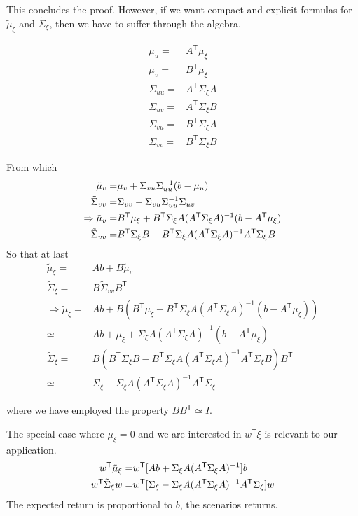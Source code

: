 \documentclass[letter, 12pt]{article}
\newcommand{\transpose}{^\mathsf{T}}
\newcommand{\inv}{^{-1}}
\begin{document}
This concludes the proof. However, if we want compact and explicit formulas for $\tilde \mu_\xi$ and $\tilde \Sigma_{\xi}$, then we have to suffer through the algebra.

\begin{align*}
\mu_u = & A\transpose \mu_\xi\\
\mu_v = & B\transpose\mu_\xi\\
\Sigma_{uu} = & A\transpose \Sigma_\xi A \\
\Sigma_{uv} = & A\transpose \Sigma_\xi B\\
\Sigma_{vu} = & B\transpose \Sigma_\xi A\\
\Sigma_{vv} = & B\transpose \Sigma_\xi B
\end{align*}

From which
\begin{align*}
\tilde\mu_v=&\mu_v + \Sigma_{vu} \Sigma_{uu}\inv(b-\mu_u) \notag \\
\tilde\Sigma_{vv}=& \Sigma_{vv} - \Sigma_{vu} \Sigma_{uu}\inv \Sigma_{uv} \\
\Rightarrow
\tilde\mu_v=& B\transpose\mu_\xi + B\transpose \Sigma_\xi A (A\transpose \Sigma_\xi A )\inv(b-A\transpose \mu_\xi) \\
\tilde\Sigma_{vv}=& B\transpose \Sigma_\xi B - B\transpose \Sigma_\xi A ( A\transpose \Sigma_\xi A) \inv A\transpose \Sigma_\xi B
\end{align*}
So that at last
\begin{align*}
\tilde \mu_\xi=& Ab + B \tilde\mu_v \\
\tilde \Sigma_{\xi}= & B\tilde\Sigma_{vv} B\transpose \\
\Rightarrow
\tilde\mu_\xi = & Ab + B(B\transpose\mu_\xi + B\transpose \Sigma_\xi A (A\transpose \Sigma_\xi A )\inv(b-A\transpose \mu_\xi))\\
\simeq & Ab + \mu_\xi + \Sigma_\xi A (A\transpose \Sigma_\xi A )\inv(b-A\transpose \mu_\xi) \\
\tilde \Sigma_{\xi} = & B (B\transpose \Sigma_\xi B - B\transpose \Sigma_\xi A ( A\transpose \Sigma_\xi A) \inv A\transpose \Sigma_\xi B) B\transpose\\
\simeq & \Sigma_\xi - \Sigma_\xi A ( A\transpose \Sigma_\xi A) \inv A\transpose \Sigma_\xi
\end{align*}

where we have employed the property $B B\transpose \simeq I$.

The special case where $\mu_\xi=0$ and we are interested in $w\transpose \xi$ is relevant to our application.
\begin{align}
w\transpose \tilde\mu_\xi = & w\transpose [A b + \Sigma_\xi A (A\transpose \Sigma_\xi A)\inv] b\label{eq:cond2}\\
w\transpose \tilde \Sigma_{\xi} w = & w\transpose [ \Sigma_\xi - \Sigma_\xi A ( A\transpose \Sigma_\xi A) \inv A\transpose \Sigma_\xi ] w\notag
\end{align}
The expected return is proportional to $b$, the scenarios returns.
%
%
\end{document}
